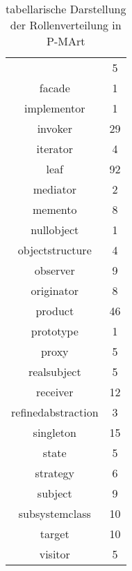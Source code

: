 \begin{table}[H]
\begin{tabular}{|c|c|}
& 5\\facade & 1\\implementor & 1\\invoker & 29\\iterator & 4\\leaf & 92\\mediator & 2\\memento & 8\\nullobject & 1\\objectstructure & 4\\observer & 9\\originator & 8\\product & 46\\prototype & 1\\proxy & 5\\realsubject & 5\\receiver & 12\\refinedabstraction & 3\\singleton & 15\\state & 5\\strategy & 6\\subject & 9\\subsystemclass & 10\\target & 10\\visitor & 5\\
        \hline
    \end{tabular}
    \caption{tabellarische Darstellung der Rollenverteilung in P-MArt}
\end{table}

